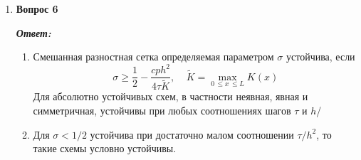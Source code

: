 \documentclass[12pt, a4paper]{article}
\begin{document}
\begin{enumerate}
		\item \textbf{Вопрос 6}
		\vspace*{0.2cm}
		
		\textit{\textbf{Ответ:}}
		
		\begin{enumerate}
			\item Смешанная разностная сетка определяемая параметром $\sigma$ устойчива, если
			\[
			\sigma \ge \dfrac{1}{2} - \dfrac{c p h^2}{4 \tau \tilde{K}}, \;\;\;\; \tilde{K}=\max\limits_{0 \, \le x \, \le L}{K(x)}
			\]
			Для абсолютно устойчивых схем, в частности неявная, явная и симметричная, устойчивы при любых соотношениях шагов $\tau$ и $h$/
			
			\item Для $\sigma < 1/2$ устойчива при достаточно малом соотношении $\tau/h^2$, то такие схемы условно устойчивы.
		\end{enumerate}
		
	\end{enumerate}
\end{document}
